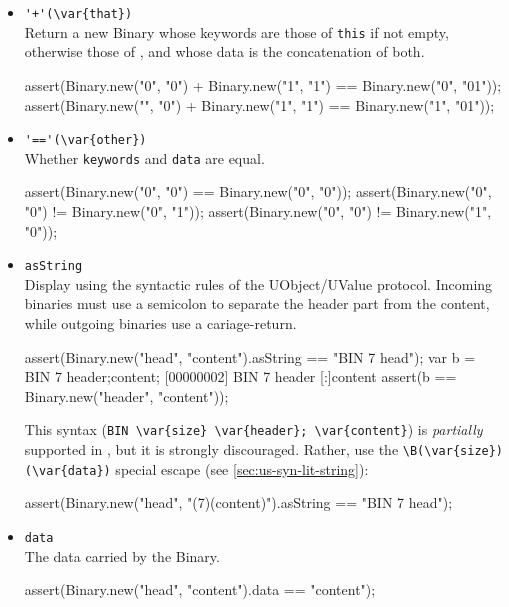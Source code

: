 \begin{itemize}
\item \lstinline|'+'(\var{that})|\\
  Return a new Binary whose keywords are those of \lstinline|this| if
  not empty, otherwise those of , and whose data is the
  concatenation of both.
\begin{urbiscript}[firstnumber=last]
assert(Binary.new("0", "0") + Binary.new("1", "1")
       == Binary.new("0", "01"));
assert(Binary.new("", "0") + Binary.new("1", "1")
       == Binary.new("1", "01"));
\end{urbiscript}

\item \lstinline|'=='(\var{other})|\\
  Whether \lstinline|keywords| and \lstinline|data| are equal.
\begin{urbiscript}[firstnumber=last]
assert(Binary.new("0", "0") == Binary.new("0", "0"));
assert(Binary.new("0", "0") != Binary.new("0", "1"));
assert(Binary.new("0", "0") != Binary.new("1", "0"));
\end{urbiscript}

\item \lstinline|asString|\\
  Display using the syntactic rules of the UObject/UValue protocol.
  Incoming binaries must use a semicolon to separate the header part
  from the content, while outgoing binaries use a cariage-return.
\begin{urbiscript}[firstnumber=last]
assert(Binary.new("head", "content").asString
       == "BIN 7 head\ncontent");
var b = BIN 7 header;content;
[00000002] BIN 7 header
[:]content
assert(b == Binary.new("header", "content"));
\end{urbiscript}

This syntax (\lstinline|BIN \var{size} \var{header}; \var{content}|)
is \emph{partially} supported in \us, but it is strongly discouraged.
Rather, use the \lstinline|\B(\var{size})(\var{data})| special escape
(see \autoref{sec:us-syn-lit-string}):

\begin{urbiscript}[firstnumber=last]
assert(Binary.new("head", "\B(7)(content)").asString
       == "BIN 7 head\ncontent");
\end{urbiscript}


\item \lstinline|data|\\
  The data carried by the Binary.
\begin{urbiscript}[firstnumber=last]
assert(Binary.new("head", "content").data == "content");
\end{urbiscript}


\end{itemize}
